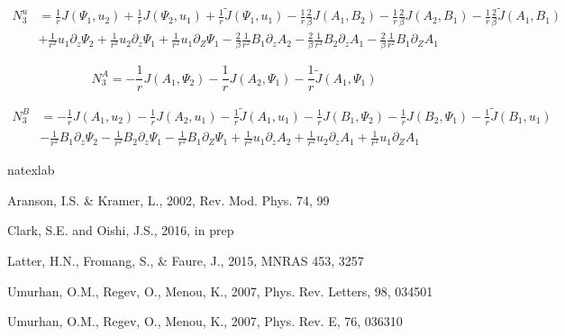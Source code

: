 \documentclass[onecolumn]{emulateapj}
\newcommand{\beq}{\begin{equation}}
\newcommand{\eeq}{\end{equation}}
\begin{document}
\beq
\begin{split}
N_3^u & = \frac{1}{r}J\left(\Psi_1, u_2\right) + \frac{1}{r}J\left(\Psi_2, u_1\right) + \frac{1}{r}\widetilde{J} \left(\Psi_1, u_1\right) - \frac{1}{r}\frac{2}{\beta} J\left(A_1, B_2\right) - \frac{1}{r} \frac{2}{\beta} J\left(A_2, B_1\right) - \frac{1}{r}\frac{2}{\beta}\widetilde{J}\left(A_1, B_1\right) \\
& + \frac{1}{r^2} u_1\partial_z \Psi_2 + \frac{1}{r^2} u_2 \partial_z \Psi_1 + \frac{1}{r^2} u_1 \partial_Z \Psi_1 - \frac{2}{\beta} \frac{1}{r^2} B_1 \partial_z A_2 - \frac{2}{\beta} \frac{1}{r^2} B_2 \partial_z A_1 - \frac{2}{\beta} \frac{1}{r^2} B_1 \partial_Z A_1
\end{split}
\eeq

\beq
N_3^A = -\frac{1}{r} J\left(A_1, \Psi_2\right) - \frac{1}{r}J\left(A_2, \Psi_1\right) - \frac{1}{r} \widetilde{J}\left(A_1, \Psi_1\right)
\eeq

\beq
\begin{split}
N_3^B & = - \frac{1}{r} J\left(A_1, u_2\right) - \frac{1}{r} J\left(A_2, u_1\right) - \frac{1}{r}\widetilde{J}\left(A_1, u_1\right) - \frac{1}{r} J\left(B_1, \Psi_2\right) - \frac{1}{r} J\left(B_2, \Psi_1\right) - \frac{1}{r} \widetilde{J} \left(B_1, u_1\right) \\ & - \frac{1}{r^2} B_1\partial_z \Psi_2 - \frac{1}{r^2} B_2 \partial_z \Psi_1 - \frac{1}{r^2} B_1 \partial_Z \Psi_1 + \frac{1}{r^2} u_1 \partial_z A_2 + \frac{1}{r^2} u_2 \partial_z A_1 + \frac{1}{r^2} u_1 \partial_Z A_1
\end{split}
\eeq




\begin{thebibliography}{53}
\expandafter\ifx\csname natexlab\endcsname\relax\def\natexlab#1{#1}\fi

Aranson, I.S. \& Kramer, L., 2002, Rev. Mod. Phys. 74, 99

Clark, S.E. and Oishi, J.S., 2016, in prep

Latter, H.N., Fromang, S., \& Faure, J., 2015, MNRAS 453, 3257

Umurhan, O.M., Regev, O., Menou, K., 2007, Phys. Rev. Letters, 98, 034501

Umurhan, O.M., Regev, O., Menou, K., 2007, Phys. Rev. E, 76, 036310


\end{thebibliography}
\end{document}
